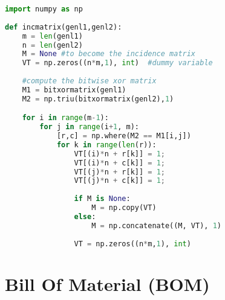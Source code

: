 \begin{lstlisting}[language=Python, caption=Python example]
import numpy as np
    
def incmatrix(genl1,genl2):
    m = len(genl1)
    n = len(genl2)
    M = None #to become the incidence matrix
    VT = np.zeros((n*m,1), int)  #dummy variable
    
    #compute the bitwise xor matrix
    M1 = bitxormatrix(genl1)
    M2 = np.triu(bitxormatrix(genl2),1) 

    for i in range(m-1):
        for j in range(i+1, m):
            [r,c] = np.where(M2 == M1[i,j])
            for k in range(len(r)):
                VT[(i)*n + r[k]] = 1;
                VT[(i)*n + c[k]] = 1;
                VT[(j)*n + r[k]] = 1;
                VT[(j)*n + c[k]] = 1;
                
                if M is None:
                    M = np.copy(VT)
                else:
                    M = np.concatenate((M, VT), 1)
                
                VT = np.zeros((n*m,1), int)
\end{lstlisting}

\lstlistoflistings

\section{Bill Of Material (BOM)\label{sec:BOM}}